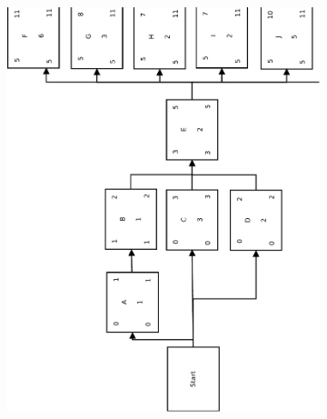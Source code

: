 \begin{figure}
    \ContinuedFloat %
    \begin{subfigure}{\textwidth}
        \includegraphics[scale=0.6]{figures/hw5-pdm-1}
    \end{subfigure}
\end{figure}
